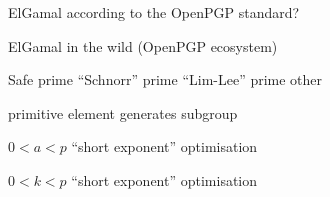 \documentclass[aspectratio=169]{beamer}
\begin{document}
\begin{frame}{ElGamal according to the OpenPGP standard?}
  \centering
\end{frame}


\begin{frame}{ElGamal in the wild (OpenPGP ecosystem)}
  \large
  \begin{description}[leftmargin=8cm]
    \setlength{\itemsep}{2em}
  \item[Large prime $p$] \hfill Safe prime \hfill ``Schnorr'' prime
    \hfill ``Lim-Lee'' prime \hfill other \hfill\strut
  \item[Generator $\alpha$] \hfill primitive element \hfill generates
    subgroup \hfill\strut
  \item[Private key] \hfill $0 < a < p$ \hfill ``short exponent'' optimisation \hfill\strut
  \item[Ephemeral key] \hfill $0 < k < p$ \hfill ``short exponent'' optimisation \hfill\strut
  \end{description}
\end{frame}
\end{document}
